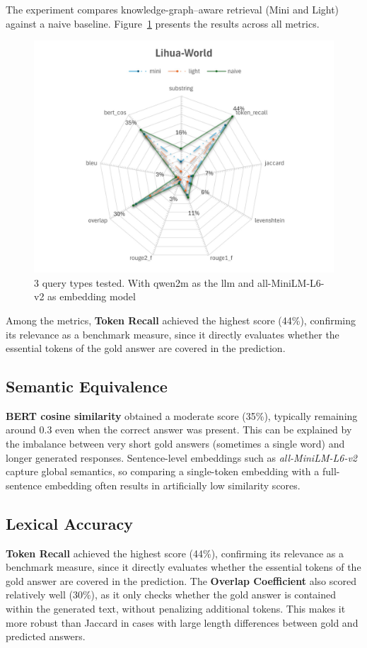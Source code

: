 The experiment compares knowledge-graph–aware retrieval (Mini and Light) against a naive baseline.
Figure~\ref{fig:Lihua-World} presents the results across all metrics.
\begin{figure}[H]
    \centering
    \includegraphics[width=1\linewidth]{Figures/Lihua-World.jpg}
    \caption{3 query types tested. With qwen2m as the llm and all-MiniLM-L6-v2 as embedding model}
    \label{fig:Lihua-World}
\end{figure}
Among the metrics, \textbf{Token Recall} achieved the highest score (44\%), confirming its relevance as a benchmark measure, since it directly evaluates whether the essential tokens of the gold answer are covered in the prediction. 

\subsection{Semantic Equivalence} 
\textbf{BERT cosine similarity} obtained a moderate score (35\%), typically remaining around 0.3 even when the correct answer was present. 
This can be explained by the imbalance between very short gold answers (sometimes a single word) and longer generated responses. 
Sentence-level embeddings such as \textit{all-MiniLM-L6-v2} capture global semantics, so comparing a single-token embedding with a full-sentence embedding often results in artificially low similarity scores.

\subsection{Lexical Accuracy} 
\textbf{Token Recall} achieved the highest score (44\%), confirming its relevance as a benchmark measure, since it directly evaluates whether the essential tokens of the gold answer are covered in the prediction. 
The \textbf{Overlap Coefficient} also scored relatively well (30\%), as it only checks whether the gold answer is contained within the generated text, without penalizing additional tokens. 
This makes it more robust than Jaccard in cases with large length differences between gold and predicted answers.

